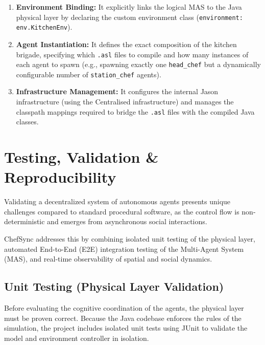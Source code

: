\documentclass{scrartcl}
\begin{document}
\begin{enumerate}
\item \textbf{Environment Binding:} It explicitly links the logical MAS to the Java physical layer by declaring the custom environment class (\texttt{environment: env.KitchenEnv}).
\item \textbf{Agent Instantiation:} It defines the exact composition of the kitchen brigade, specifying which \texttt{.asl} files to compile and how many instances of each agent to spawn (e.g., spawning exactly one \texttt{head\_chef} but a dynamically configurable number of \texttt{station\_chef} agents).
\item \textbf{Infrastructure Management:} It configures the internal Jason infrastructure (using the Centralised infrastructure) and manages the classpath mappings required to bridge the \texttt{.asl} files with the compiled Java classes.
\end{enumerate}


\newpage
\section{Testing, Validation \& Reproducibility}

Validating a decentralized system of autonomous agents presents unique challenges compared to standard procedural software, as the control flow is non-deterministic and emerges from asynchronous social interactions. 

ChefSync addresses this by combining isolated unit testing of the physical layer, automated End-to-End (E2E) integration testing of the Multi-Agent System (MAS), and real-time observability of spatial and social dynamics.

\subsection{Unit Testing (Physical Layer Validation)}

Before evaluating the cognitive coordination of the agents, the physical layer must be proven correct. Because the Java codebase enforces the rules of the simulation, the project includes isolated unit tests using JUnit to validate the model and environment controller in isolation.
\end{document}
